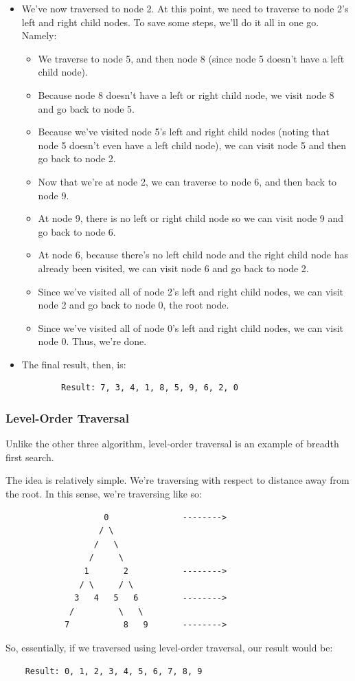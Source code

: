 \documentclass[letterpaper]{article}
\begin{document}
\begin{itemize}
    \item We've now traversed to node 2. At this point, we need to traverse to node 2's left and right child nodes. To save some steps, we'll do it all in one go. Namely: 
    \begin{itemize}
        \item We traverse to node 5, and then node 8 (since node 5 doesn't have a left child node). 
        \item Because node 8 doesn't have a left or right child node, we visit node 8 and go back to node 5.
        \item Because we've visited node 5's left and right child nodes (noting that node 5 doesn't even have a left child node), we can visit node 5 and then go back to node 2. 
        \item Now that we're at node 2, we can traverse to node 6, and then back to node 9. 
        \item At node 9, there is no left or right child node so we can visit node 9 and go back to node 6. 
        \item At node 6, because there's no left child node and the right child node has already been visited, we can visit node 6 and go back to node 2. 
        \item Since we've visited all of node 2's left and right child nodes, we can visit node 2 and go back to node 0, the root node. 
        \item Since we've visited all of node 0's left and right child nodes, we can visit node 0. Thus, we're done.
    \end{itemize}

    \item The final result, then, is: 
    \begin{verbatim}
        Result: 7, 3, 4, 1, 8, 5, 9, 6, 2, 0
    \end{verbatim}
\end{itemize}

\subsubsection{Level-Order Traversal}
Unlike the other three algorithm, level-order traversal is an example of breadth first search. 

\bigskip 

The idea is relatively simple. We're traversing with respect to distance away from the root. In this sense, we're traversing like so: 
\begin{verbatim}
                    0               -------->
                   / \
                  /   \
                 /     \
                1       2           -------->
               / \     / \ 
              3   4   5   6         -------->
             /         \   \ 
            7           8   9       -------->
\end{verbatim}
So, essentially, if we traversed using level-order traversal, our result would be: 
\begin{verbatim}
    Result: 0, 1, 2, 3, 4, 5, 6, 7, 8, 9
\end{verbatim}
\end{document}
